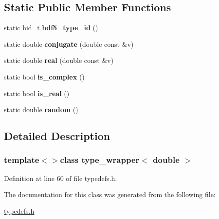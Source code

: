 \subsection*{Static Public Member Functions}
\begin{DoxyCompactItemize}
\item 
\hypertarget{classtype__wrapper_3_01double_01_4_a309fd4c77522ae1635f31d061ab78524}{}static hid\+\_\+t {\bfseries hdf5\+\_\+type\+\_\+id} ()\label{classtype__wrapper_3_01double_01_4_a309fd4c77522ae1635f31d061ab78524}

\item 
\hypertarget{classtype__wrapper_3_01double_01_4_a1bc72fe32f74e08a0c81b0920385f847}{}static double {\bfseries conjugate} (double const \&v)\label{classtype__wrapper_3_01double_01_4_a1bc72fe32f74e08a0c81b0920385f847}

\item 
\hypertarget{classtype__wrapper_3_01double_01_4_a53f4425c7e053e5c06f1bb8cb25d4987}{}static double {\bfseries real} (double const \&v)\label{classtype__wrapper_3_01double_01_4_a53f4425c7e053e5c06f1bb8cb25d4987}

\item 
\hypertarget{classtype__wrapper_3_01double_01_4_a8e7073c13394c3def9d7ecaee5f92d7f}{}static bool {\bfseries is\+\_\+complex} ()\label{classtype__wrapper_3_01double_01_4_a8e7073c13394c3def9d7ecaee5f92d7f}

\item 
\hypertarget{classtype__wrapper_3_01double_01_4_ad9b0e1d60040f554d9ff9a43dae06751}{}static bool {\bfseries is\+\_\+real} ()\label{classtype__wrapper_3_01double_01_4_ad9b0e1d60040f554d9ff9a43dae06751}

\item 
\hypertarget{classtype__wrapper_3_01double_01_4_ac4da068371e5d277a371247b50ac3058}{}static double {\bfseries random} ()\label{classtype__wrapper_3_01double_01_4_ac4da068371e5d277a371247b50ac3058}

\end{DoxyCompactItemize}


\subsection{Detailed Description}
\subsubsection*{template$<$$>$class type\+\_\+wrapper$<$ double $>$}



Definition at line 60 of file typedefs.\+h.



The documentation for this class was generated from the following file\+:\begin{DoxyCompactItemize}
\item 
\hyperlink{typedefs_8h}{typedefs.\+h}\end{DoxyCompactItemize}
